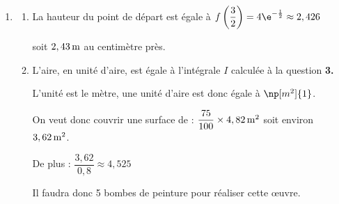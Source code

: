\begin{enumerate}
\begin{enumerate}
$I \approx 4,821$ soit $4,82$ à $10^{-2}$ près.

	\end{enumerate}

	\item
	\begin{enumerate}
	\item  La hauteur du point de départ est égale à $f\left(\dfrac{3}{2}\right)= 4\e^{-\frac{1}{2}} \approx 2,426$

soit $2,43\,\rm{m}$ au centimètre près.

	\item L'aire, en unité d'aire,  est égale à l'intégrale $I$ calculée à la question \textbf{3.}

L'unité est le mètre, une unité d'aire est donc égale à $\np[m^2]{1}$.

On veut donc couvrir une surface de : \quad $\dfrac{75}{100} \times 4,82 \, \rm{m}^2$ soit environ $3,62 \,\rm{m}^2$.

De plus : $\dfrac{3,62}{0,8} \approx 4,525$

Il faudra donc 5 bombes de peinture pour réaliser cette œuvre.
	\end{enumerate}
\end{enumerate}
\medskip
